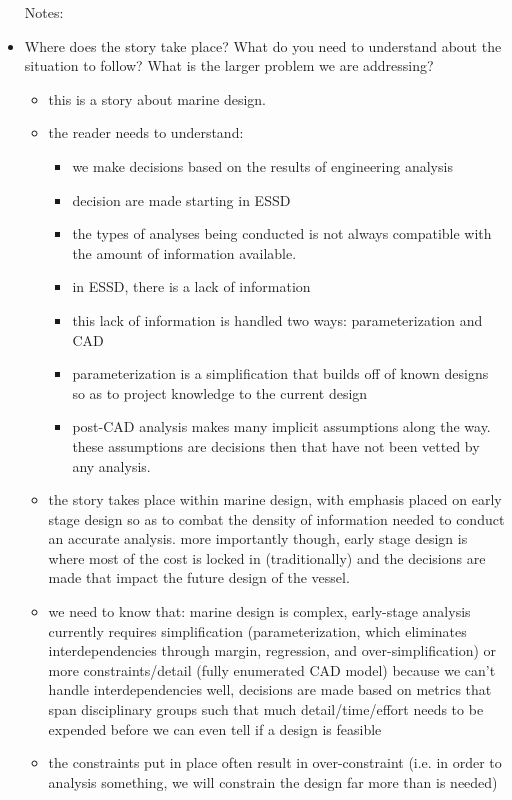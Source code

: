 \documentclass[preprint,12pt]{elsarticle}
\begin{document}
\begin{itemize}
	\item[Notes:]
	\item Where does the story take place? What do you need to understand about the situation to follow? What is the larger problem we are addressing?
	\begin{itemize}
		\item this is a story about marine design.
		\item the reader needs to understand:
		\begin{itemize}
			\item we make decisions based on the results of engineering analysis
			\item decision are made starting in ESSD
			\item the types of analyses being conducted is not always compatible with the amount of information available.
			\item in ESSD, there is a lack of information
			\item this lack of information is handled two ways: parameterization and CAD
			\item parameterization is a simplification that builds off of known designs so as to project knowledge to the current design
			\item post-CAD analysis makes many implicit assumptions along the way. these assumptions are decisions then that have not been vetted by any analysis.
		\end{itemize} 
		\item the story takes place within marine design, with emphasis placed on early stage design so as to combat the density of information needed to conduct an accurate analysis. more importantly though, early stage design is where most of the cost is locked in (traditionally) and the decisions are made that impact the future design of the vessel.
		\item we need to know that: marine design is complex, early-stage analysis currently requires simplification (parameterization, which eliminates interdependencies through margin, regression, and over-simplification) or more constraints/detail (fully enumerated CAD model) because we can't handle interdependencies well, decisions are made based on metrics that span disciplinary groups such that much detail/time/effort needs to be expended before we can even tell if a design is feasible
		\item the constraints put in place often result in over-constraint (i.e. in order to analysis something, we will constrain the design far more than is needed)

\end{itemize}
\end{itemize}
\end{document}
